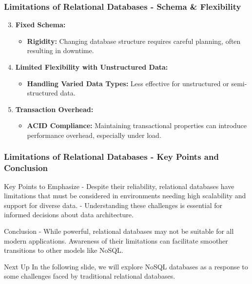 \documentclass[aspectratio=169]{beamer}
\begin{document}
\begin{frame}[fragile]
    \frametitle{Limitations of Relational Databases - Schema & Flexibility}
    \begin{enumerate}
        \setcounter{enumi}{2}
        \item \textbf{Fixed Schema:}
        \begin{itemize}
            \item \textbf{Rigidity:} Changing database structure requires careful planning, often resulting in downtime.
        \end{itemize}

        \item \textbf{Limited Flexibility with Unstructured Data:}
        \begin{itemize}
            \item \textbf{Handling Varied Data Types:} Less effective for unstructured or semi-structured data.
        \end{itemize}
            
        \item \textbf{Transaction Overhead:}
        \begin{itemize}
            \item \textbf{ACID Compliance:} Maintaining transactional properties can introduce performance overhead, especially under load.
        \end{itemize}
    \end{enumerate}
\end{frame}

\begin{frame}[fragile]
    \frametitle{Limitations of Relational Databases - Key Points and Conclusion}
    \begin{block}{Key Points to Emphasize}
        - Despite their reliability, relational databases have limitations that must be considered in environments needing high scalability and support for diverse data.
        - Understanding these challenges is essential for informed decisions about data architecture.
    \end{block}

    \begin{block}{Conclusion}
        - While powerful, relational databases may not be suitable for all modern applications. Awareness of their limitations can facilitate smoother transitions to other models like NoSQL.
    \end{block}

    \begin{block}{Next Up}
        In the following slide, we will explore NoSQL databases as a response to some challenges faced by traditional relational databases.
    \end{block}
\end{frame}
\end{document}
